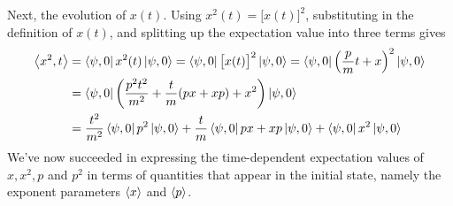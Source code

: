 \documentclass[11pt, a4paper]{article}
\begin{document}
\begin{itemize}
	Next, the evolution of $ x(t) $. Using $ x^{2}(t) = \big[x(t)\big]^{2} $, substituting in the definition of $ x(t) $, and splitting up the expectation value into three terms gives
	\begin{align*}
		\ev{x^{2}, t} &= \bra{\psi, 0} x^{2}(t) \ket{\psi, 0} =  \bra{\psi, 0} \big[x(t)\big]^{2} \ket{\psi, 0} = \bra{\psi, 0}\left(\frac{p}{m}t + x\right)^{2} \ket{\psi, 0}\\
		&= \bra{\psi, 0}\left(\frac{p^{2}t^{2}}{m^{2}} + \frac{t}{m}(px + xp) + x^{2}\right)\ket{\psi, 0}\\
		&= \frac{t^{2}}{m^{2}}\bra{\psi, 0} p^{2} \ket{\psi, 0} + \frac{t}{m}\bra{\psi, 0} px + xp \ket{\psi, 0} + \bra{\psi, 0} x^{2} \ket{\psi, 0}
	\end{align*}
	We've now succeeded in expressing the time-dependent expectation values of $ x, x^{2}, p $ and $ p^{2} $ in terms of quantities that appear in the initial state, namely the exponent parameters $ \ev{x} $ and $ \ev{p} $. 
	

\end{itemize}
\end{document}
